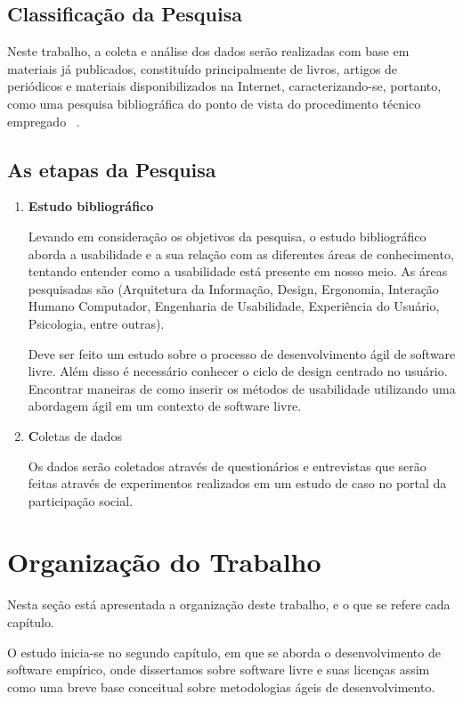 \subsection{Classificação da Pesquisa}

Neste trabalho, a coleta e análise dos dados serão realizadas com base em  materiais já publicados, constituído principalmente de livros, artigos de periódicos e  materiais disponibilizados na Internet, caracterizando-se, portanto, como uma pesquisa bibliográfica do ponto de vista do procedimento técnico empregado ~\cite{gil1991}.


\subsection{As etapas da Pesquisa}

\begin{enumerate}
\item \textbf{Estudo bibliográfico}

Levando em consideração os objetivos da pesquisa, o estudo bibliográfico aborda a usabilidade e a sua relação com as diferentes áreas de conhecimento, tentando entender como a usabilidade está presente em nosso meio. As áreas pesquisadas são (Arquitetura da Informação, Design, Ergonomia, Interação Humano Computador, Engenharia de Usabilidade, Experiência do Usuário, Psicologia, entre outras).

Deve ser feito um estudo sobre o processo de desenvolvimento ágil de software livre. Além disso é necessário conhecer o ciclo de design centrado no usuário. Encontrar maneiras de como inserir os métodos de usabilidade utilizando uma abordagem ágil em um contexto de software livre. 

\item \textbf Coletas de dados

Os dados serão coletados através de questionários e entrevistas que serão feitas através de experimentos realizados em um estudo de caso no portal da participação social.

\end{enumerate}

\section{Organização do Trabalho}

Nesta seção está apresentada a organização deste trabalho, e o que se refere cada capítulo.

O estudo inicia-se no segundo capítulo, em que se aborda o desenvolvimento de software empírico, onde dissertamos sobre software livre e suas licenças assim como uma breve base conceitual sobre metodologias ágeis de desenvolvimento.
	
